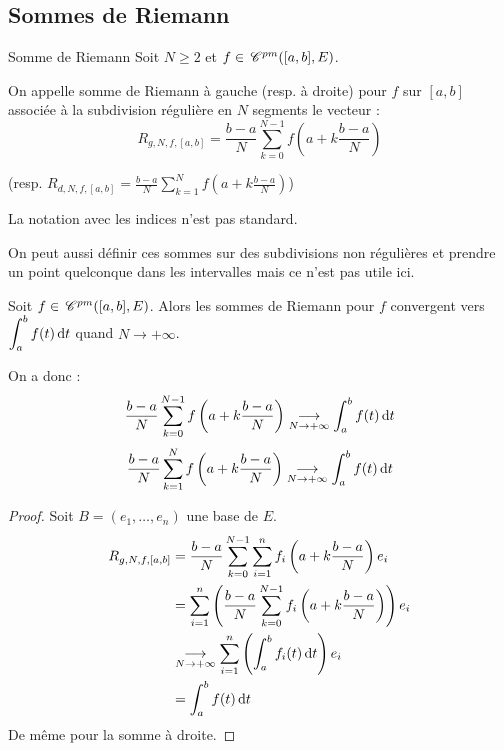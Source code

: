 \subsection{Sommes de Riemann}

\begin{definition}{Somme de Riemann}{}
    Soit $N \geqslant 2$ et $f \in \,\mathscr C^{pm}([a, b], E)$.

    On appelle somme de Riemann à gauche (resp. à droite) pour $f$ sur $[a, b]$ associée à la 
    subdivision régulière en $N$ segments le vecteur :
    \[R_{g, N, f, [a, b]} = \frac{b-a} N \sum_{k=0}^{N-1} f\left( a + k \frac{b-a}{N} \right)\]

    (resp. $\displaystyle R_{d, N, f, [a, b]} = \frac{b-a} N \sum_{k=1}^{N} f\left( a + k \frac{b-a}{N} \right)$)
\end{definition}

\begin{remarque}
    La notation avec les indices n'est pas standard.
    
    On peut aussi définir ces sommes sur des subdivisions non régulières et prendre un point quelconque dans les intervalles mais ce n'est pas utile ici.
\end{remarque}

\begin{proposition}{}{}
    Soit $f \in \,\mathscr C^{pm}([a, b], E)$. Alors les sommes de Riemann pour $f$ convergent vers 
    $\displaystyle \int_a^b f(t) \,\mathrm{d}t$ quand $N \to +\infty$.

    On a donc :
    \[\frac{b - a }{N } \sum_{k = 0 }^{N - 1 } f\left( a + k \frac{b - a } N \right) \underset{N \to + \infty}{\longrightarrow} \int_a^b f(t) \,\mathrm{d}t\]
    \[\frac{b - a }{N } \sum_{k = 1 }^{N} f\left( a + k \frac{b - a } N \right) \underset{N \to + \infty}{\longrightarrow} \int_a^b f(t) \,\mathrm{d}t\]
\end{proposition}


\begin{proof}
Soit $B= (e_1,\dots,e_n)$ une base de $E$.
    \begin{align*}
        R_{g, N, f, [a, b]} & = \frac{b - a }{N } \sum_{k = 0 }^{N - 1 } \sum_{i = 1 }^{n } f_i\left( a + k \frac{b - a } N \right) e_i \\
        & = \sum_{i = 1 }^{n } \left( \frac{b - a }{N } \sum_{k = 0 }^{N - 1 } f_i\left( a + k \frac{b - a } N \right) \right) e_i \\
        & \underset{N \to + \infty}{\longrightarrow} \sum_{i = 1 }^{n } \left( \int_a^b f_i(t) \,\mathrm{d}t \right) e_i \\
        & = \int_a^b f(t) \,\mathrm{d}t
    \end{align*}
De même pour la somme à droite.
\end{proof}

